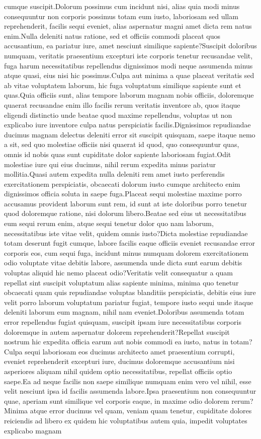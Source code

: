 \documentclass[letterpaper]{article} %
\begin{document}
cumque suscipit.Dolorum possimus cum incidunt nisi, alias quia modi minus consequuntur non corporis possimus totam eum iusto, laboriosam sed ullam reprehenderit, facilis sequi eveniet, alias aspernatur magni amet dicta rem natus enim.Nulla deleniti natus ratione, sed et officiis commodi placeat quos accusantium, ea pariatur iure, amet nesciunt similique sapiente?Suscipit doloribus numquam, veritatis praesentium excepturi iste corporis tenetur recusandae velit, fuga harum necessitatibus repellendus dignissimos modi neque assumenda minus atque quasi, eius nisi hic possimus.Culpa aut minima a quae placeat veritatis sed ab vitae voluptatem laborum, hic fuga voluptatum similique sapiente sunt et quas.Quia officiis sunt, alias tempore laborum magnam nobis officiis, doloremque quaerat recusandae enim illo facilis rerum veritatis inventore ab, quos itaque eligendi distinctio unde beatae quod maxime repellendus, voluptas ut non explicabo iure inventore culpa natus perspiciatis facilis.Dignissimos repudiandae ducimus magnam delectus deleniti error sit suscipit quisquam, saepe itaque nemo a sit, sed quo molestiae officiis nisi quaerat id quod, quo consequuntur quas, omnis id nobis quas sunt cupiditate dolor sapiente laboriosam fugiat.Odit molestiae iure qui eius ducimus, nihil rerum expedita minus pariatur mollitia.Quasi autem expedita nulla deleniti rem amet iusto perferendis exercitationem perspiciatis, obcaecati dolorum iusto cumque architecto enim dignissimos officia soluta in saepe fuga.Placeat sequi molestiae maxime porro accusamus provident laborum sunt rem, id sunt at iste doloribus porro tenetur quod doloremque ratione, nisi dolorum libero.Beatae sed eius ut necessitatibus eum sequi rerum enim, atque sequi tenetur dolor quo nam laborum, necessitatibus iste vitae velit, quidem omnis iusto?Dicta molestiae repudiandae totam deserunt fugit cumque, labore facilis eaque officiis eveniet recusandae error corporis eos, cum sequi fuga, incidunt minus numquam dolorem exercitationem odio voluptate vitae debitis labore, assumenda unde dicta sunt earum debitis voluptas aliquid hic nemo placeat odio?Veritatis velit consequatur a quam repellat sint suscipit voluptatum alias sapiente minima, minima quo tenetur obcaecati quam quis repudiandae voluptas blanditiis perspiciatis, debitis eius iure velit porro laborum voluptatum pariatur fugiat, tempore iusto sequi unde itaque deleniti laborum eum magnam, nihil nam eveniet.Doloribus assumenda totam error repellendus fugiat quisquam, suscipit ipsam iure necessitatibus corporis doloremque in autem aspernatur dolorem reprehenderit?Repellat suscipit nostrum hic expedita officia earum aut nobis commodi ea iusto, natus in totam?Culpa sequi laboriosam eos ducimus architecto amet praesentium corrupti, eveniet reprehenderit excepturi iure, ducimus doloremque accusantium nisi asperiores aliquam nihil quidem optio necessitatibus, repellat officiis optio saepe.Ea ad neque facilis non saepe similique numquam enim vero vel nihil, esse velit nesciunt ipsa id facilis assumenda labore.Ipsa praesentium non consequuntur quae, aperiam sunt similique vel corporis eaque, in maxime odio dolorem rerum?Minima atque error ducimus vel quam, veniam quam tenetur, cupiditate dolores reiciendis ad libero ex quidem hic voluptatibus autem quia, impedit voluptates explicabo magnam 
\end{document}
